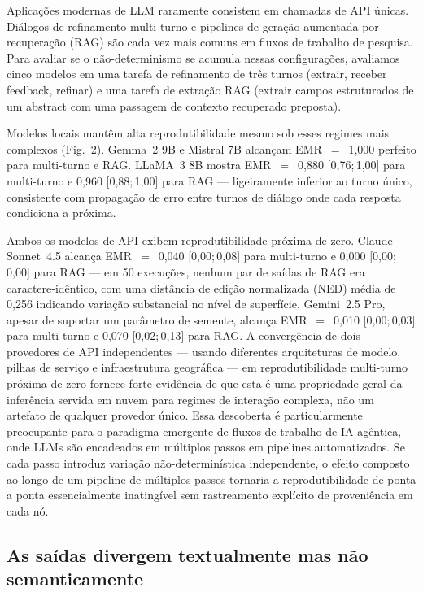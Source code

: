 \documentclass[12pt,a4paper]{article}
\begin{document}
Aplicações modernas de LLM raramente consistem em chamadas de API únicas.
Diálogos de refinamento multi-turno e pipelines de geração aumentada por recuperação (RAG) são cada vez mais comuns em fluxos de trabalho de pesquisa.
Para avaliar se o não-determinismo se acumula nessas configurações, avaliamos cinco modelos em uma tarefa de refinamento de três turnos (extrair, receber feedback, refinar) e uma tarefa de extração RAG (extrair campos estruturados de um abstract com uma passagem de contexto recuperado preposta).

Modelos locais mantêm alta reprodutibilidade mesmo sob esses regimes mais complexos (Fig.~2).
Gemma~2 9B e Mistral 7B alcançam EMR~$=$~1,000 perfeito para multi-turno e RAG.
LLaMA~3 8B mostra EMR~$=$~0,880 [0,76;\,1,00] para multi-turno e 0,960 [0,88;\,1,00] para RAG --- ligeiramente inferior ao turno único, consistente com propagação de erro entre turnos de diálogo onde cada resposta condiciona a próxima.

Ambos os modelos de API exibem reprodutibilidade próxima de zero.
Claude Sonnet~4.5 alcança EMR~$=$~0,040 [0,00;\,0,08] para multi-turno e 0,000 [0,00;\,0,00] para RAG --- em 50 execuções, nenhum par de saídas de RAG era caractere-idêntico, com uma distância de edição normalizada (NED) média de 0,256 indicando variação substancial no nível de superfície.
Gemini~2.5 Pro, apesar de suportar um parâmetro de semente, alcança EMR~$=$~0,010 [0,00;\,0,03] para multi-turno e 0,070 [0,02;\,0,13] para RAG.
A convergência de dois provedores de API independentes --- usando diferentes arquiteturas de modelo, pilhas de serviço e infraestrutura geográfica --- em reprodutibilidade multi-turno próxima de zero fornece forte evidência de que esta é uma propriedade geral da inferência servida em nuvem para regimes de interação complexa, não um artefato de qualquer provedor único.
Essa descoberta é particularmente preocupante para o paradigma emergente de fluxos de trabalho de IA agêntica, onde LLMs são encadeados em múltiplos passos em pipelines automatizados.
Se cada passo introduz variação não-determinística independente, o efeito composto ao longo de um pipeline de múltiplos passos tornaria a reprodutibilidade de ponta a ponta essencialmente inatingível sem rastreamento explícito de proveniência em cada nó.


\subsection*{As saídas divergem textualmente mas não semanticamente}
\end{document}
